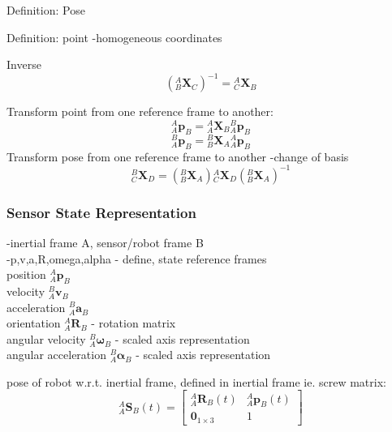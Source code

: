 		Definition: Pose
			
		Definition: point
		-homogeneous coordinates		
		
		Inverse
		\begin{equation}
			({^{A}_{B}\mathbf{X}^{}_{C}})^{-1} = {^{A}_{C}\mathbf{X}^{}_{B}}
		\end{equation}
		
		Transform point from one reference frame to another:
		\begin{equation}
			{^{A}_{A}\mathbf{p}^{}_{B}} = {^{A}_{A}\mathbf{X}^{}_{B}}{^{B}_{A}\mathbf{p}^{}_{B}}
		\end{equation}
		\begin{equation}
			{^{B}_{A}\mathbf{p}^{}_{B}} = {^{B}_{B}\mathbf{X}^{}_{A}}{^{A}_{A}\mathbf{p}^{}_{B}}
		\end{equation}
		Transform pose from one reference frame to another	
		-change of basis
		\begin{equation}
			{^{B}_{C}\mathbf{X}^{}_{D}} = ({^{B}_{B}\mathbf{X}^{}_{A}}){^{A}_{C}\mathbf{X}^{}_{D}}({^{B}_{B}\mathbf{X}^{}_{A}})^{-1}
		\end{equation}

	
	\subsubsection{Sensor State Representation}
		-inertial frame A, sensor/robot frame  B\\
		-p,v,a,R,omega,alpha - define, state reference frames\\	
		position $^{A}_{A}\mathbf{p}^{}_{B}$\\
		velocity $^{B}_{A}\mathbf{v}^{}_{B}$\\
		acceleration $^{B}_{A}\mathbf{a}^{}_{B}$\\
		orientation $^{A}_{A}\mathbf{R}^{}_{B}$ - rotation matrix\\
		angular velocity $^{B}_{A}\mathbf{\omega}^{}_{B}$ - scaled axis representation\\
		angular acceleration $^{B}_{A}\mathbf{\alpha}^{}_{B}$ - scaled axis representation
		
		pose of robot w.r.t. inertial frame, defined in inertial frame ie. screw matrix:
		\begin{equation}
				{^{A}_{A}\mathbf{S}^{}_{B}(t)} = 
				\begin{bmatrix}
						  ^{A}_{A}\mathbf{R}^{}_{B}(t) 	& 	^{A}_{A}\mathbf{p}^{}_{B}(t)\\
						  \textbf{0}_{1 \times 3} & 1						  
				\end{bmatrix}
		\end{equation}
		
